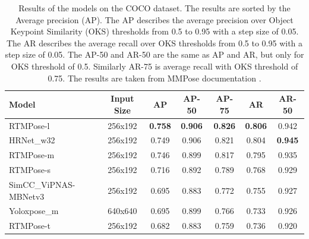 \begin{table}[htbp]
    \setlength{\tabcolsep}{4pt}
    \centering
    \begin{tabular}{lcccccc}
        \toprule
        \textbf{Model}        & \textbf{Input Size} & \textbf{AP}    & \textbf{AP-50} & \textbf{AP-75} & \textbf{AR}    & \textbf{AR-50} \\
        \midrule
        RTMPose-l             & 256x192             & \textbf{0.758} & \textbf{0.906} & \textbf{0.826} & \textbf{0.806} & 0.942          \\
        HRNet\_w32            & 256x192             & 0.749          & 0.906          & 0.821          & 0.804          & \textbf{0.945} \\
        RTMPose-m             & 256x192             & 0.746          & 0.899          & 0.817          & 0.795          & 0.935          \\
        RTMPose-s             & 256x192             & 0.716          & 0.892          & 0.789          & 0.768          & 0.929          \\
        SimCC\_ViPNAS-MBNetv3 & 256x192             & 0.695          & 0.883          & 0.772          & 0.755          & 0.927          \\
        Yoloxpose\_m          & 640x640             & 0.695          & 0.899          & 0.766          & 0.733          & 0.926          \\
        RTMPose-t             & 256x192             & 0.682          & 0.883          & 0.759          & 0.736          & 0.920          \\


        \bottomrule
    \end{tabular}
    \caption{Results of the models on the COCO dataset. The results are sorted by the Average precision (AP). The AP describes the average precision over Object Keypoint Similarity (OKS) thresholds from 0.5 to 0.95 with a step size of 0.05. The AR describes the average recall over OKS thresholds from 0.5 to 0.95 with a step size of 0.05. The AP-50 and AR-50 are the same as AP and AR, but only for OKS threshold of 0.5. Similarly AR-75 is average recall with OKS threshold of 0.75. The results are taken from MMPose documentation \cite{mmpose2020}.}
    \label{tab:evaluation_results_coco}

\end{table}

